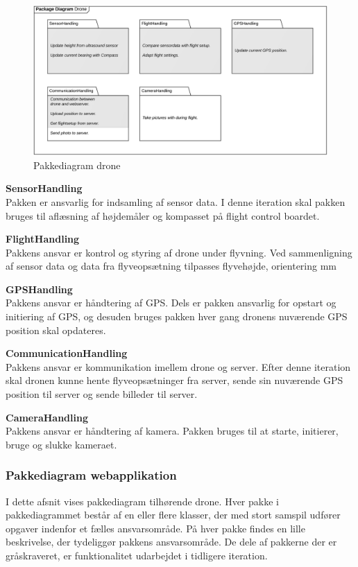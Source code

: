\begin{figure}[H]
	\centering
	\includegraphics[width=1\textwidth]{Billeder/pakke_diagrammer/iteration3_drone.png}
	\vspace{-0.5cm}
	\caption{Pakkediagram drone}
	\label{fig:iteration2_pakke_diagram_drone}
\end{figure}

\textbf{SensorHandling}\\
Pakken er ansvarlig for indsamling af sensor data. I denne iteration skal pakken bruges til aflæsning af højdemåler og kompasset på flight control boardet. 

\textbf{FlightHandling}\\
Pakkens ansvar er kontrol og styring af drone under flyvning. Ved sammenligning af sensor data og data fra flyveopsætning tilpasses flyvehøjde, orientering mm

\textbf{GPSHandling}\\
Pakkens ansvar er håndtering af GPS. Dels er pakken ansvarlig for opstart og initiering af GPS, og desuden bruges pakken hver gang dronens nuværende GPS position skal opdateres.

\textbf{CommunicationHandling}\\
Pakkens ansvar er kommunikation imellem drone og server. Efter denne iteration skal dronen kunne hente flyveopsætninger fra server, sende sin nuværende GPS position til server og sende billeder til server.

\textbf{CameraHandling}\\
Pakkens ansvar er håndtering af kamera. Pakken bruges til at starte, initierer, bruge og slukke kameraet.


\newpage
\subsubsection*{Pakkediagram webapplikation}
I dette afsnit vises pakkediagram tilhørende drone. Hver pakke i pakkediagrammet består af en eller flere klasser, der med stort samspil udfører opgaver indenfor et fælles ansvarsområde. 
På hver pakke findes en lille beskrivelse, der tydeliggør pakkens ansvarsområde. De dele af pakkerne der er gråskraveret, er funktionalitet udarbejdet i tidligere iteration. \\


